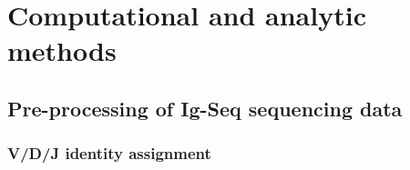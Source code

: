 \section{Computational and analytic methods}

\subsection{Pre-processing of Ig-Seq sequencing data}




\subsubsection{V/D/J identity assignment}